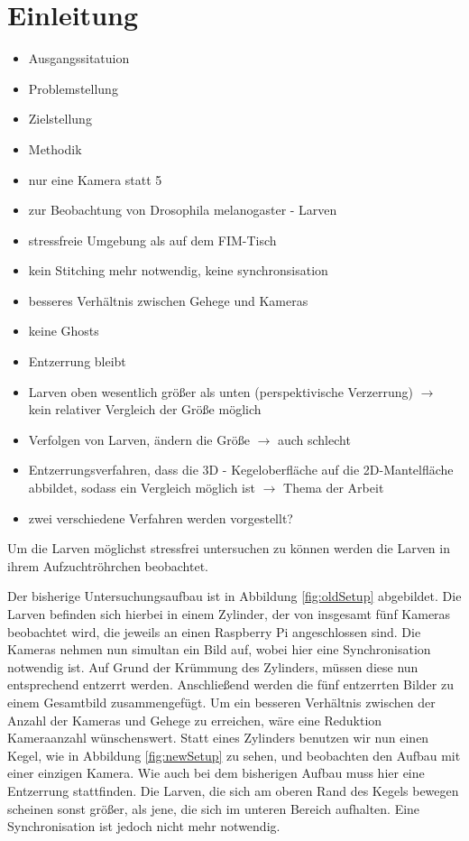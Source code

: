 \chapter{Einleitung}
\begin{itemize}
	\item Ausgangssitatuion
	\item Problemstellung
	\item Zielstellung
	\item Methodik
	\item nur eine Kamera statt 5
	\item zur Beobachtung von Drosophila melanogaster - Larven
	\item stressfreie Umgebung als auf dem FIM-Tisch
	\item kein Stitching mehr notwendig, keine synchronsisation
	\item besseres Verhältnis zwischen Gehege und Kameras
	\item keine Ghosts
	\item Entzerrung bleibt
	\item Larven oben wesentlich größer als unten (perspektivische Verzerrung) $\rightarrow$ kein relativer Vergleich der Größe möglich
	\item Verfolgen von Larven, ändern die Größe $\rightarrow$ auch schlecht
	\item Entzerrungsverfahren, dass die 3D - Kegeloberfläche auf die 2D-Mantelfläche abbildet, sodass ein Vergleich möglich ist $\rightarrow$ Thema der Arbeit
	\item zwei verschiedene Verfahren werden vorgestellt?
\end{itemize}

Um die Larven möglichst stressfrei untersuchen zu können werden die Larven in ihrem Aufzuchtröhrchen beobachtet. 

Der bisherige Untersuchungsaufbau ist in Abbildung \ref{fig:oldSetup} abgebildet. Die Larven befinden sich hierbei in einem Zylinder, der von insgesamt fünf Kameras beobachtet wird, die jeweils an einen Raspberry Pi angeschlossen sind. Die Kameras nehmen nun simultan ein Bild auf, wobei hier eine Synchronisation notwendig ist. Auf Grund der Krümmung des Zylinders, müssen diese nun entsprechend entzerrt werden. Anschließend werden die fünf entzerrten Bilder zu einem Gesamtbild zusammengefügt. 
Um ein besseren Verhältnis zwischen der Anzahl der Kameras und Gehege zu erreichen, wäre eine Reduktion Kameraanzahl wünschenswert. 
Statt eines Zylinders benutzen wir nun einen Kegel, wie in Abbildung \ref{fig:newSetup} zu sehen, und beobachten den Aufbau mit einer einzigen Kamera. Wie auch bei dem bisherigen Aufbau muss hier eine Entzerrung stattfinden. Die Larven, die sich am oberen Rand des Kegels bewegen scheinen sonst größer, als jene, die sich im unteren Bereich aufhalten. Eine Synchronisation ist jedoch nicht mehr notwendig. 


